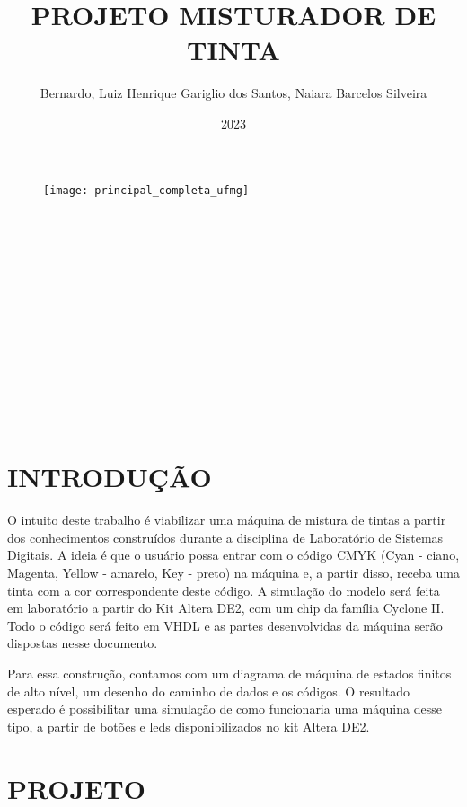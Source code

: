 \documentclass[12pt,a4paper,oneside]{abntex2}
\author{Bernardo, Luiz Henrique Gariglio dos Santos, Naiara Barcelos Silveira}
\title{PROJETO MISTURADOR DE TINTA}
\date{2023}
\renewcommand{\imprimircapa}{
	\begin{capa}
		\begin{center}
            \begin{figure}[h]
				\centering
				\texttt{[image: principal\_completa\_ufmg]}
				\label{fig:principalcompletaufmg}
			\end{figure}
            \vspace{4cm}
    		{\normalsize\imprimirautor}\\[4cm]
    		{\normalsize\textbf{\imprimirtitulo}}\\
    		\vfill
    		{\normalsize\imprimirlocal}\\
    		{\normalsize\imprimirdata}
        \end{center}		
	\end{capa}
}
\newcommand{\folhaderostonova}{
	\begin{center}
        {\normalsize \imprimirautor } \\[5cm]
    	{\normalsize \textbf{\imprimirtitulo}} \\[4.5cm]
    	\hspace{.45 \textwidth} %
    	\begin{minipage}{.5\textwidth}
    		\imprimirpreambulo \\ \\
    		\imprimirorientadorRotulo \imprimirorientador \\ \\
    		\imprimircoorientadorRotulo \imprimircoorientador
    	\end{minipage}
    	\center
    	\vfill
    	{\normalsize \imprimirlocal } \\
    	{\normalsize \imprimirdata}
    \end{center}
}
\begin{document}
	\imprimircapa
	\folhaderostonova
	\newpage
	\listoffigures*
	\newpage
	\listoftables*
	\tableofcontents* \thispagestyle{empty} %
	\mainmatter %
	
	\chapter{INTRODUÇÃO}
        O intuito deste trabalho é viabilizar uma máquina de mistura de tintas a partir dos conhecimentos construídos durante a disciplina de Laboratório de Sistemas Digitais. A ideia é que o usuário possa entrar com o código CMYK (Cyan - ciano, Magenta, Yellow - amarelo, Key - preto) na máquina e, a partir disso, receba uma tinta com a cor correspondente deste código. A simulação do modelo será feita em laboratório a partir do Kit Altera DE2, com um chip da família Cyclone II. Todo o código será feito em VHDL e as partes desenvolvidas da máquina serão dispostas nesse documento. \par
        Para essa construção, contamos com um diagrama de máquina de estados finitos de alto nível, um desenho do caminho de dados e os códigos. O resultado esperado é possibilitar uma simulação de como funcionaria uma máquina desse tipo, a partir de botões e leds disponibilizados no kit Altera DE2.
        
	\chapter{PROJETO}
\end{document}
